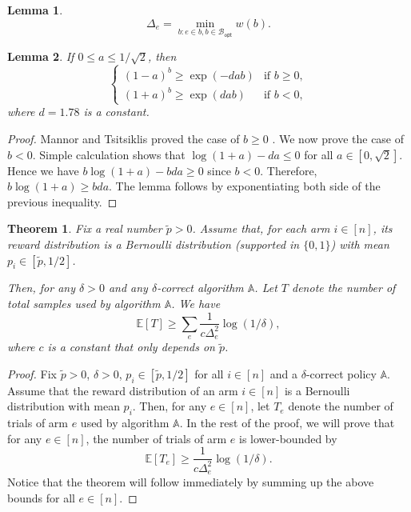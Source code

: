 \documentclass{article}
\newtheorem{lemma}{Lemma}
\newtheorem{theorem}{Theorem}
\newcommand{\E}{\mathbb E}
\newcommand{\Bopt}{\mathcal B_{\mathsf{opt}}}
\begin{document}
\begin{spacing}{1.1}
\begin{lemma}
$$
\Delta_e = \min_{b: e \in b, b \in \Bopt} w(b).
$$
\end{lemma}

\begin{lemma}
If $0\le a \le 1/\sqrt{2}$, then 
$$
\begin{cases}
  (1-a)^b \ge \exp(-dab) & \text{if } b \ge 0,\\
  (1+a)^b \ge \exp(dab) & \text{if } b < 0,
\end{cases}
$$
where $d=1.78$ is a constant.
\label{lemma:exp}
\end{lemma}

\begin{proof}
Mannor and Tsitsiklis proved the case of $b \ge 0$ \citep[Lemma 3]{mannor2004sample}.
We now prove the case of $b < 0$.
Simple calculation shows that $\log(1+a)-da \le 0$ for all $a \in [0,\sqrt{2}]$.
Hence we have $b\log(1+a)-bda \ge 0$ since $b < 0$.
Therefore, $b\log(1+a)\ge bda$.
The lemma follows by exponentiating both side of the previous inequality.
\end{proof}

\begin{theorem}
Fix a real number $\tilde p > 0$.
Assume that, for each arm $i\in [n]$, its reward distribution is a Bernoulli distribution (supported in $\{0,1\}$) with mean $p_i \in [\tilde p, 1/2]$.

Then, for any $\delta > 0$
and any $\delta$-correct algorithm $\mathbb A$.
Let $T$ denote the number of total samples used by algorithm $\mathbb A$.
We have
$$
\E[T] \ge \sum_e \frac{1}{c\Delta_e^2}\log(1/\delta),
$$
where $c$ is a constant that only depends on $\tilde p$.
\end{theorem}


\begin{proof}
Fix $\tilde p>0$, $\delta >0$, $p_i \in [\tilde p,1/2]$ for all $i\in[n]$ and a $\delta$-correct policy $\mathbb A$.
Assume that the reward distribution of an arm $i\in [n]$ is a Bernoulli distribution with mean $p_i$.
Then, for any $e\in [n]$, let $T_e$ denote the  number of trials of arm $e$ used by algorithm $\mathbb A$.
In the rest of the proof, we will prove that for any $e\in [n]$, the number of trials of arm $e$ is lower-bounded by
\begin{equation}
\E[T_e] \ge \frac{1}{c\Delta_e^2}\log(1/\delta).
\label{eq:lower-each}
\end{equation}
Notice that the theorem will follow immediately by summing up the above bounds for all $e\in[n]$.



\end{proof}
\end{spacing}
\end{document}
